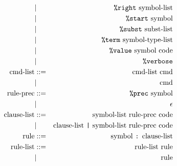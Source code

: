 \begin{eqnarray*}
 & | & \mbox{{\tt \%right} symbol-list} \\
 & | & \mbox{{\tt \%start} symbol} \\
 & | & \mbox{{\tt \%subst} subst-list} \\
 & | & \mbox{{\tt \%term} symbol-type-list} \\
 & | & \mbox{{\tt \%value} symbol code} \\
 & | & \mbox{{\tt \%verbose}} \\
\mbox{cmd-list} & ::= &\mbox{ cmd-list cmd} \\
 & | & \mbox{cmd} \\
\mbox{rule-prec} & ::= & \mbox{{\tt \%prec} symbol} \\
            &  | & \epsilon \\
\mbox{clause-list} & ::= & \mbox{symbol-list rule-prec code} \\
              &  | &  \mbox{clause-list {\tt |} symbol-list rule-prec code} \\
\mbox{rule} & ::= & \mbox{symbol {\tt :} clause-list} \\
\mbox{rule-list} & ::= & \mbox{rule-list rule} \\
            &  |  & \mbox{rule} 
\end{eqnarray*}
